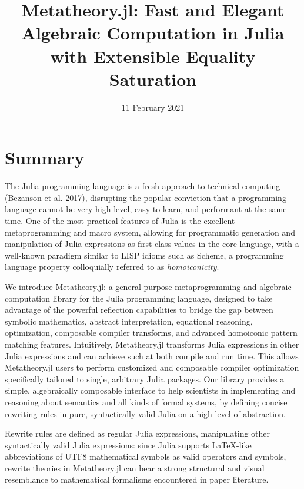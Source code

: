 \documentclass[
]{article}
\title{Metatheory.jl: Fast and Elegant Algebraic Computation in Julia
with Extensible Equality Saturation}
\author{}
\date{11 February 2021}
\begin{document}
\maketitle

\hypertarget{summary}{%
\section{Summary}\label{summary}}

The Julia programming language is a fresh approach to technical
computing (Bezanson et al. 2017), disrupting the popular conviction that
a programming language cannot be very high level, easy to learn, and
performant at the same time. One of the most practical features of Julia
is the excellent metaprogramming and macro system, allowing for
programmatic generation and manipulation of Julia expressions as
first-class values in the core language, with a well-known paradigm
similar to LISP idioms such as Scheme, a programming language property
colloquially referred to as \emph{homoiconicity}.

We introduce Metatheory.jl: a general purpose metaprogramming and
algebraic computation library for the Julia programming language,
designed to take advantage of the powerful reflection capabilities to
bridge the gap between symbolic mathematics, abstract interpretation,
equational reasoning, optimization, composable compiler transforms, and
advanced homoiconic pattern matching features. Intuitively,
Metatheory.jl transforms Julia expressions in other Julia expressions
and can achieve such at both compile and run time. This allows
Metatheory.jl users to perform customized and composable compiler
optimization specifically tailored to single, arbitrary Julia packages.
Our library provides a simple, algebraically composable interface to
help scientists in implementing and reasoning about semantics and all
kinds of formal systems, by defining concise rewriting rules in pure,
syntactically valid Julia on a high level of abstraction.

Rewrite rules are defined as regular Julia expressions, manipulating
other syntactically valid Julia expressions: since Julia supports
LaTeX-like abbreviations of UTF8 mathematical symbols as valid operators
and symbols, rewrite theories in Metatheory.jl can bear a strong
structural and visual resemblance to mathematical formalisms encountered
in paper literature.
\end{document}
